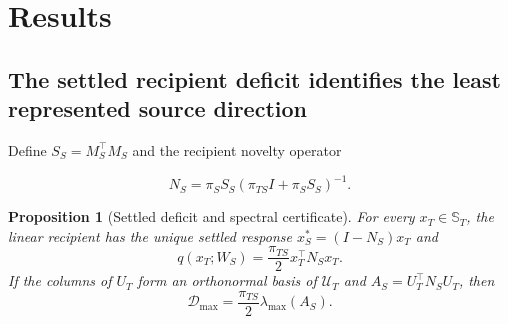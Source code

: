 \documentclass[10pt,letterpaper]{article}
\theoremstyle{plain}
\newtheorem{proposition}{Proposition}
\theoremstyle{remark}
\begin{document}
\section{Results}

\subsection{The settled recipient deficit identifies the least represented source direction}

Define $S_S=M_S^\top M_S$ and the recipient novelty operator

\begin{equation}
N_S=\pi_SS_S(\pi_{TS}I+\pi_SS_S)^{-1}.
\label{eq:novelty-operator}
\end{equation}

\begin{proposition}[Settled deficit and spectral certificate]
\label{prop:deficit}
For every $x_T\in\mathbb S_T$, the linear recipient has the unique settled response $x_S^*=(I-N_S)x_T$ and
\begin{equation}
q(x_T;W_S)=\frac{\pi_{TS}}2x_T^\top N_Sx_T.
\label{eq:deficit-quadratic}
\end{equation}
If the columns of $U_T$ form an orthonormal basis of $\mathcal U_T$ and $A_S=U_T^\top N_SU_T$, then
\begin{equation}
\mathcal D_{\max}=\frac{\pi_{TS}}2\lambda_{\max}(A_S).
\label{eq:deficit-spectrum}
\end{equation}
\end{proposition}

\end{document}
